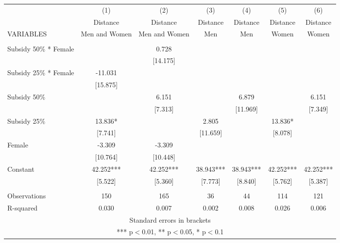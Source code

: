 \begin{tabular}{lcccccc} \hline
 & (1) & (2) & (3) & (4) & (5) & (6) \\
 & Distance & Distance & Distance & Distance & Distance & Distance \\
VARIABLES & Men and Women & Men and Women & Men & Men & Women & Women \\ \hline
 &  &  &  &  &  &  \\
Subsidy 50\% * Female &  & 0.728 &  &  &  &  \\
 &  & [14.175] &  &  &  &  \\
Subsidy 25\% * Female & -11.031 &  &  &  &  &  \\
 & [15.875] &  &  &  &  &  \\
Subsidy 50\% &  & 6.151 &  & 6.879 &  & 6.151 \\
 &  & [7.313] &  & [11.969] &  & [7.349] \\
Subsidy 25\% & 13.836* &  & 2.805 &  & 13.836* &  \\
 & [7.741] &  & [11.659] &  & [8.078] &  \\
Female & -3.309 & -3.309 &  &  &  &  \\
 & [10.764] & [10.448] &  &  &  &  \\
Constant & 42.252*** & 42.252*** & 38.943*** & 38.943*** & 42.252*** & 42.252*** \\
 & [5.522] & [5.360] & [7.773] & [8.840] & [5.762] & [5.387] \\
 &  &  &  &  &  &  \\
Observations & 150 & 165 & 36 & 44 & 114 & 121 \\
 R-squared & 0.030 & 0.007 & 0.002 & 0.008 & 0.026 & 0.006 \\ \hline
\multicolumn{7}{c}{ Standard errors in brackets} \\
\multicolumn{7}{c}{ *** p$<$0.01, ** p$<$0.05, * p$<$0.1} \\
\end{tabular}
